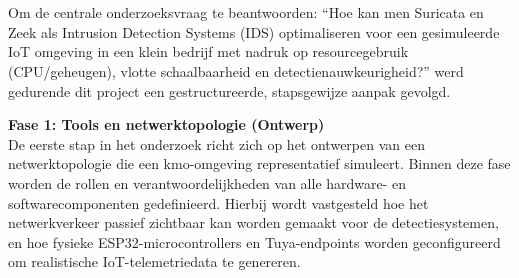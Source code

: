 
\chapter{}%
\label{ch:methodologie}


Om de centrale onderzoeksvraag te beantwoorden: “Hoe kan men Suricata en Zeek als Intrusion Detection Systems (IDS) optimaliseren voor een gesimuleerde IoT omgeving in een klein bedrijf met nadruk op resourcegebruik (CPU/geheugen), vlotte schaalbaarheid en detectienauwkeurigheid?” werd gedurende dit project een gestructureerde, stapsgewijze aanpak gevolgd. 

\vspace{1em}
\textbf{Fase 1: Tools en netwerktopologie (Ontwerp)} \\
De eerste stap in het onderzoek richt zich op het ontwerpen van een netwerktopologie die een kmo-omgeving representatief simuleert. Binnen deze fase worden de rollen en verantwoordelijkheden van alle hardware- en softwarecomponenten gedefinieerd. Hierbij wordt vastgesteld hoe het netwerkverkeer passief zichtbaar kan worden gemaakt voor de detectiesystemen, en hoe fysieke ESP32-microcontrollers en Tuya-endpoints worden geconfigureerd om realistische IoT-telemetriedata te genereren.

